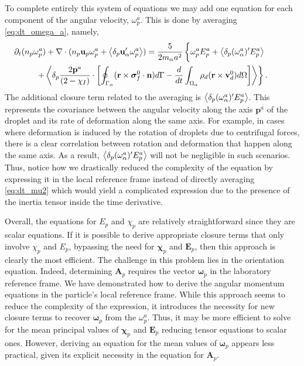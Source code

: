 To complete entirely this system of equations we may add one equation for each component of the angular velocity, $\omega_p^a$. 
This is done by averaging \ref{eq:dt_omega_a}, namely,
\begin{multline}
    \pddt (n_p \omega^a_p)
    + \div (
        n_p \textbf{u}_p \omega^a_p 
        + \pavg{\textbf{u}_\alpha' \omega^a_p}
    )
    = 
    \frac{5}{2 m_\alpha a^2}\left\{
        \omega^a_p E^a_p + \pavg{(\omega^a_\alpha)' E^a_p} \phantom{\intS{}} \right. \\ \left.
        +\pavg{
        \frac{2 \textbf{p}^a}{ (2 - \chi_I)}\cdot 
        \left[\intS{(\textbf{r}\times\bm\sigma_f^0\cdot \textbf{n})} 
        - \ddt\intO{\rho_d(\textbf{r}\times \textbf{v}_d^0)}\right]
        }
    \right\}. 
\end{multline}
The additional closure term related to the averaging is $\left<\delta_p (\omega^a_\alpha)' E^a_p\right>$.
This represents the covariance between the angular velocity along the axis $\textbf{p}^a$ of the droplet and its rate of deformation along the same axis. 
For example, in cases where deformation is induced by the rotation of droplets due to centrifugal forces, there is a clear correlation between rotation and deformation that happen along the same axis. 
As a result, $\left<\delta_p (\omega^a_\alpha)' E^a_p\right>$ will not be negligible in such scenarios.
Thus, notice how we drastically reduced the complexity of the equation by expressing it in the local reference frame instead of directly averaging \ref{eq:dt_mu2} which would yield a complicated expression due to the presence of the inertia tensor inside the time derivative.  

Overall, the equations for $E_p$ and $\chi_p$ are relatively straightforward since they are scalar equations. 
If it is possible to derive appropriate closure terms that only involve $\chi_p$ and $E_p$, bypassing the need for $\bm\chi_p$ and $\textbf{E}_p$, then this approach is clearly the most efficient. 
The challenge in this problem lies in the orientation equation.
Indeed, determining $\textbf{A}_p$ requires the vector $\bm\omega_p$ in the laboratory reference frame.
We have demonstrated how to derive the angular momentum equations in the particle's local reference frame. 
While this approach seems to reduce the complexity of the expression, it introduces the necessity for new closure terms to recover $\bm\omega_p$ from the $\omega^a_p$. 
Thus, it may be more efficient to solve for the mean principal values of $\bm\chi_p$ and $\textbf{E}_p$ reducing tensor equations to scalar ones.
However, deriving an equation for the mean values of $\bm\omega_p$ appears less practical, given its explicit necessity in the equation for $\textbf{A}_p$. 

